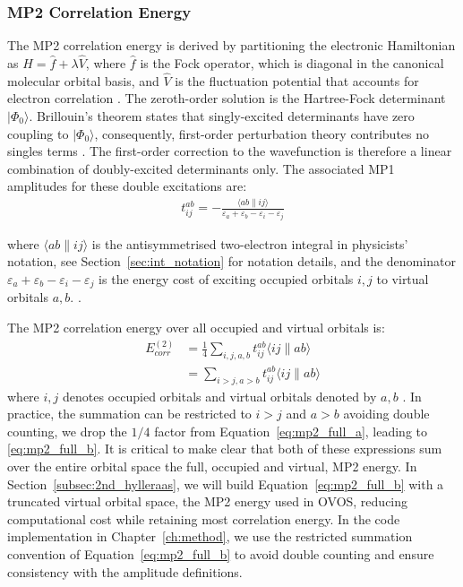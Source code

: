 \subsubsection{MP2 Correlation Energy}

The MP2 correlation energy is derived by partitioning the electronic Hamiltonian as $\hat{H} = \hat{f} + \lambda \hat{V}$, where $\hat{f}$ is the Fock operator, which is diagonal in the canonical molecular orbital basis, and $\hat{V}$ is the fluctuation potential that accounts for electron correlation \cite{Helgaker2000}.
The zeroth-order solution is the Hartree-Fock determinant $|\Phi_0\rangle$. Brillouin's theorem states that singly-excited determinants have zero coupling to $|\Phi_0\rangle$, consequently, first-order perturbation theory contributes no singles terms \cite{Helgaker2000, Jensen2017}. The first-order correction to the wavefunction is therefore a linear combination of doubly-excited determinants only. The associated MP1 amplitudes for these double excitations are:
\begin{align}
    \label{eq:mp1_amps}
    t_{ij}^{ab} = -\frac{\langle ab \| ij \rangle}{\varepsilon_a + \varepsilon_b - \varepsilon_i - \varepsilon_j}
\end{align}

where $\langle ab \| ij \rangle$ is the antisymmetrised two-electron integral in physicists' notation, see Section~\ref{sec:int_notation} for notation details, and the denominator $\varepsilon_a + \varepsilon_b - \varepsilon_i - \varepsilon_j$ is the energy cost of exciting occupied orbitals $i,j$ to virtual orbitals $a,b$. \cite{Helgaker2000, Jensen2017}.

The MP2 correlation energy over all occupied and virtual orbitals is: 
\begin{subequations}
\begin{align}
E_{corr}^{(2)} &= \frac{1}{4} \sum_{i,j,a,b} t_{ij}^{ab} \langle ij \| ab \rangle \label{eq:mp2_full_a} \\
&= \sum_{i>j,a>b} t_{ij}^{ab} \langle ij \| ab \rangle \label{eq:mp2_full_b}
\end{align}
\end{subequations}
where $i,j$ denotes occupied orbitals and virtual orbitals denoted by $a,b$ \cite{Helgaker2000}. In practice, the summation can be restricted to $i > j$ and $a > b$ avoiding double counting, we drop the $1/4$ factor from Equation~\ref{eq:mp2_full_a}, leading to \ref{eq:mp2_full_b}. It is critical to make clear that both of these expressions sum over the entire orbital space the full, occupied and virtual, MP2 energy. In Section~\ref{subsec:2nd_hylleraas}, we will build Equation~\ref{eq:mp2_full_b} with a truncated virtual orbital space, the MP2 energy used in OVOS, reducing computational cost while retaining most correlation energy. In the code implementation in Chapter~\ref{ch:method}, we use the restricted summation convention of Equation~\ref{eq:mp2_full_b} to avoid double counting and ensure consistency with the amplitude definitions. 


